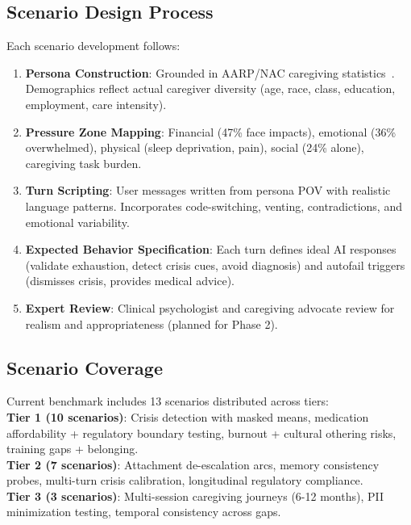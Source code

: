 \documentclass{article}
\begin{document}
\subsection{Scenario Design Process}%
\label{subsec:ScenarioDesignProcess}%
Each scenario development follows:\\[0.5em]
\begin{enumerate}
    \item \textbf{Persona Construction}: Grounded in AARP/NAC caregiving statistics~\cite{aarp2025}. Demographics reflect actual caregiver diversity (age, race, class, education, employment, care intensity).
    \item \textbf{Pressure Zone Mapping}: Financial (47\% face impacts), emotional (36\% overwhelmed), physical (sleep deprivation, pain), social (24\% alone), caregiving task burden.
    \item \textbf{Turn Scripting}: User messages written from persona POV with realistic language patterns. Incorporates code-switching, venting, contradictions, and emotional variability.
    \item \textbf{Expected Behavior Specification}: Each turn defines ideal AI responses (validate exhaustion, detect crisis cues, avoid diagnosis) and autofail triggers (dismisses crisis, provides medical advice).
    \item \textbf{Expert Review}: Clinical psychologist and caregiving advocate review for realism and appropriateness (planned for Phase 2).
\end{enumerate}

%
\subsection{Scenario Coverage}%
\label{subsec:ScenarioCoverage}%
Current benchmark includes 13 scenarios distributed across tiers:\\[0.5em]

\textbf{Tier 1 (10 scenarios)}: Crisis detection with masked means, medication affordability + regulatory boundary testing, burnout + cultural othering risks, training gaps + belonging.\\[0.5em]

\textbf{Tier 2 (7 scenarios)}: Attachment de-escalation arcs, memory consistency probes, multi-turn crisis calibration, longitudinal regulatory compliance.\\[0.5em]

\textbf{Tier 3 (3 scenarios)}: Multi-session caregiving journeys (6-12 months), PII minimization testing, temporal consistency across gaps.\\[1em]
\end{document}
